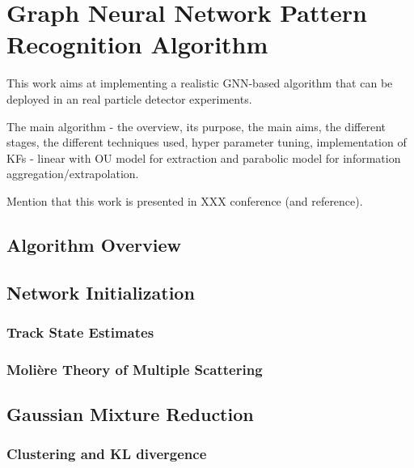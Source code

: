 
\chapter{Graph Neural Network Pattern Recognition Algorithm}\label{chapter-5}


This work aims at implementing a realistic GNN-based algorithm that can be deployed in an real particle detector experiments.

The main algorithm - the overview, its purpose, the main aims, the different stages, the different techniques used, hyper parameter tuning, implementation of KFs - linear with OU model for extraction and parabolic model for information aggregation/extrapolation.

Mention that this work is presented in XXX conference (and reference).

\section{Algorithm Overview}

\section{Network Initialization}
\subsection{Track State Estimates}
\subsection{Molière Theory of Multiple Scattering}

\section{Gaussian Mixture Reduction}
\subsection{Clustering and KL divergence}

